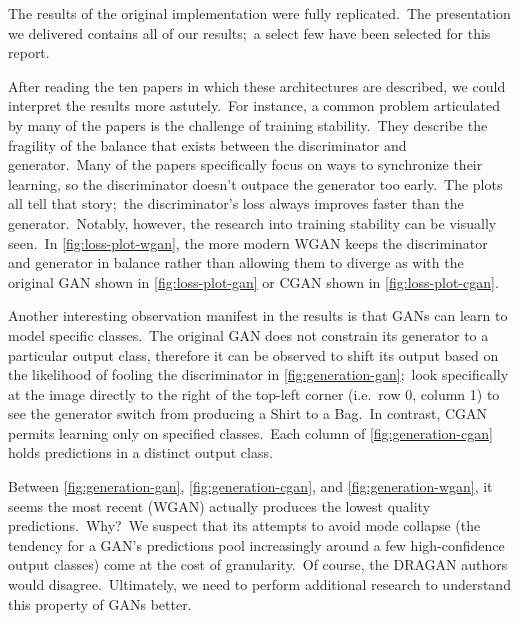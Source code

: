 \documentclass[conference]{IEEEtran}
\begin{document}
    The results of the original implementation were fully replicated.\ The presentation we delivered contains all of our results;\ a select few have been selected for this report.

    After reading the ten papers in which these architectures are described, we could interpret the results more astutely.\ For instance, a common problem articulated by many of the papers is the challenge of training stability.\ They describe the fragility of the balance that exists between the discriminator and generator.\ Many of the papers specifically focus on ways to synchronize their learning, so the discriminator doesn't outpace the generator too early.\ The plots all tell that story;\ the discriminator's loss always improves faster than the generator.\ Notably, however, the research into training stability can be visually seen.\ In \autoref{fig:loss-plot-wgan}, the more modern WGAN keeps the discriminator and generator in balance rather than allowing them to diverge as with the original GAN shown in \autoref{fig:loss-plot-gan} or CGAN shown in \autoref{fig:loss-plot-cgan}.

    Another interesting observation manifest in the results is that GANs can learn to model specific classes.\ The original GAN does not constrain its generator to a particular output class, therefore it can be observed to shift its output based on the likelihood of fooling the discriminator in \autoref{fig:generation-gan};\ look specifically at the image directly to the right of the top-left corner (i.e.\ row 0, column 1) to see the generator switch from producing a Shirt to a Bag.\ In contrast, CGAN permits learning only on specified classes.\ Each column of \autoref{fig:generation-cgan} holds predictions in a distinct output class.

    Between \autoref{fig:generation-gan}, \autoref{fig:generation-cgan}, and \autoref{fig:generation-wgan}, it seems the most recent (WGAN) actually produces the lowest quality predictions.\ Why?\ We suspect that its attempts to avoid mode collapse (the tendency for a GAN's predictions pool increasingly around a few high-confidence output classes) come at the cost of granularity.\ Of course, the DRAGAN authors would disagree.\ Ultimately, we need to perform additional research to understand this property of GANs better.
\end{document}
